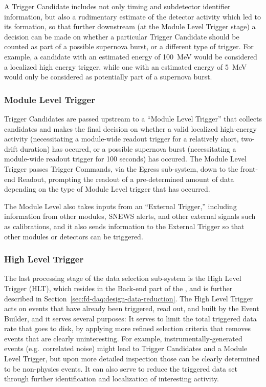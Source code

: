 A Trigger Candidate includes not only timing and subdetector
identifier information, but also a rudimentary estimate of the detector
activity which led to its formation, so that further downstream (at
the Module Level Trigger stage) a decision can be made on 
whether a particular Trigger Candidate should be counted as part of a possible supernova
burst, or a different type of trigger. For example,
a candidate with an estimated energy of 100~MeV would be considered a
localized high energy trigger, while
one with an estimated energy of 5~MeV would only be considered as potentially part of a
supernova burst.

\subsubsection{Module Level Trigger}
Trigger Candidates are passed upstream to a “Module Level Trigger'' that collects candidates
and makes the final decision on whether a valid localized high-energy
activity (necessitating a module-wide readout trigger for a relatively
short, two-drift duration) has occured,
or a possible supernova burst (necessitating a module-wide readout
trigger for 100 seconds) has occured. The Module Level Trigger passes
Trigger Commands, via the Egress sub-system, down to the front-end 
Readout, prompting the readout of a pre-determined amount of data depending
on the type of Module Level trigger that has occurred. 

The Module Level also takes inputs 
from an “External Trigger,” including information from other
modules, SNEWS alerts, and other external signals such as
calibrations, 
and it also sends information to the External Trigger so that other modules or
detectors can be triggered.

\subsubsection{High Level Trigger}

The last processing stage of the data selection sub-system is the High
Level Trigger (HLT), which resides in the
Back-end part of the , and is further described in
Section~\ref{sec:fd-daq:design-data-reduction}. The High Level Trigger
acts on events that have already been triggered, read out, 
and built by the Event Builder, and it serves several purposes: It
serves to limit the total triggered data rate that goes to disk, by
applying more refined selection criteria that removes events that are clearly uninteresting. For example, instrumentally-generated events
(e.g.~correlated noise) might lead to Trigger Candidates and a Module
Level Trigger, but upon more detailed inspection those can be clearly determined
to be non-physics events. It can also serve to reduce the triggered
data set through further identification and localization of
interesting activity.

